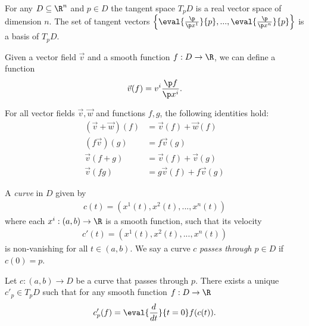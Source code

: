 \documentclass{article}
\begin{document}
\begin{theorem}[Notes 4.4]
    For any $D\subseteq \R^n$ and $p\in D$ the tangent space $T_pD$ is a real vector space
    of dimension $n$. The set of tangent vectors 
    $\left\lbrace\eval{\frac{\p }{\p x^1}}{p}, ...,\eval{\frac{\p }{\p x^n}}{p}\right\rbrace$
    is a basis of $T_pD$.
\end{theorem}

\begin{definition}
    Given a vector field $\vec v$ and a smooth function $f:D\to\R$,
    we can define a function 
    \begin{align*}
        \vec v(f) = v^i\frac{\p f}{\p x^i}.
    \end{align*}
\end{definition}

\begin{proposition}[Notes 4.7]
    For all vector fields $\vec v,\vec w$ and functions $f,g$, the following identities hold:
    \begin{align*}
        (\vec v+\vec w)(f) &= \vec v(f) + \vec w(f)\\
        (f\vec v)(g)  &= f\vec v(g) \\
        \vec v(f+g)   &= \vec v(f) + \vec v(g) \\
        \vec v(fg)    &= g\vec v(f) + f\vec v(g)
    \end{align*}
\end{proposition}

\begin{definition}
    A \emph{curve} in $D$ given by
    \begin{align*}
        c(t) = (x^1(t), x^2(t), ..., x^n(t))
    \end{align*}
    where each $x^i:(a,b)\to\R$ is a smooth function, such that its velocity
    \begin{align*}
        c'(t)=(x^1(t), x^2(t), ..., x^n(t))
    \end{align*}
    is non-vanishing for all $t\in(a,b)$. 
    We say a curve $c$ \emph{passes through $p\in D$} if $c(0)=p$.
\end{definition}

\begin{proposition}[Notes 4.9]
    Let $c:(a,b)\to D$ be a curve that passes through $p$. There exists a unique
    $c'_p\in T_p D$ such that for any smooth function $f:D\to\R$
    \begin{align*}
        c'_p(f) = \eval{\frac{d}{dt}}{t=0} f(c(t)).
    \end{align*}
\end{proposition}
\end{document}

